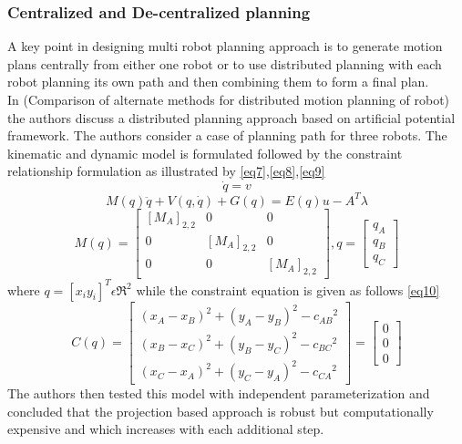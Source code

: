 \subsubsection{Centralized and De-centralized planning}
A key point in designing multi robot planning approach is to generate motion plans centrally from either one robot or to use distributed planning with each robot planning its own path and then combining them to form a final plan. \\
In \cite{8}(Comparison of alternate methods for distributed motion planning of robot) the authors discuss a distributed planning approach based on artificial potential framework. The authors consider a case of planning path for three robots. The kinematic and dynamic model is formulated followed by the constraint relationship formulation as illustrated by \eqref{eq7},\eqref{eq8},\eqref{eq9}
\begin{equation}
\label{eq7}
\dot{q} = v
\end{equation}
\begin{equation}
\label{eq8}
M(q)\ddot{q} + V(q,\dot{q}) + G(q) = E(q)u - A^{T}\lambda
\end{equation}
\begin{equation}
\label{eq9}
M(q) = \begin{bmatrix} [M_{A}]_{2,2} & 0 & 0\\ 0 & [M_{A}]_{2,2}& 0\\ 0 & 0 & [M_{A}]_{2,2} \end{bmatrix},q = \begin{bmatrix} q_{A}\\ q_{B}\\ q_{C} \end{bmatrix}
\end{equation}
where $q=[x_{i} y_{i}]^{T} \epsilon \Re^{2}$
while the constraint equation is given as follows \eqref{eq10}
\begin{equation}
\label{eq10}
C(q) = \begin{bmatrix} (x_{A} - x_{B})^{2} + (y_{A} - y_{B})^{2} - {c_{AB}}^2\\ (x_{B} - x_{C})^{2} + (y_{B} - y_{C})^{2} - {c_{BC}}^2\\ (x_{C} - x_{A})^{2} + (y_{C} - y_{A})^{2} - {c_{CA}}^2 \end{bmatrix} = \begin{bmatrix} 0\\ 0\\ 0 \end{bmatrix}
\end{equation}
The authors then tested this model with independent parameterization and concluded that the projection based approach is robust but computationally expensive and which increases with each additional step. 


